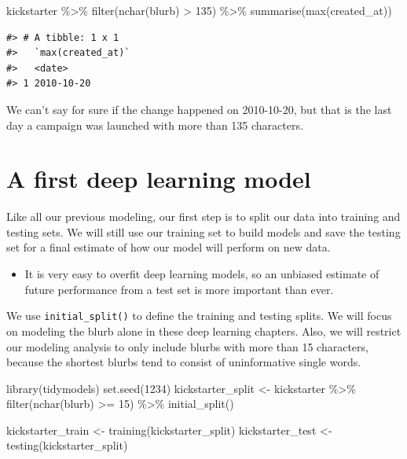 \documentclass[
]{krantz}
\makeatletter
\newenvironment{Shaded}{\begin{snugshade}}{\end{snugshade}}
\newcommand{\DecValTok}[1]{\textcolor[rgb]{0.00,0.00,0.81}{#1}}
\newcommand{\FunctionTok}[1]{\textcolor[rgb]{0.00,0.00,0.00}{#1}}
\newcommand{\NormalTok}[1]{#1}
\newcommand{\OtherTok}[1]{\textcolor[rgb]{0.56,0.35,0.01}{#1}}
\newcommand{\SpecialCharTok}[1]{\textcolor[rgb]{0.00,0.00,0.00}{#1}}
\newenvironment{kframe}{%
\medskip{}
\setlength{\fboxsep}{.8em}
 \def\at@end@of@kframe{}%
 \ifinner\ifhmode%
  \def\at@end@of@kframe{\end{minipage}}%
  \begin{minipage}{\columnwidth}%
 \fi\fi%
 \def\FrameCommand##1{\hskip\@totalleftmargin \hskip-\fboxsep
 \colorbox{shadecolor}{##1}\hskip-\fboxsep
     \hskip-\linewidth \hskip-\@totalleftmargin \hskip\columnwidth}%
 \MakeFramed {\advance\hsize-\width
   \@totalleftmargin\z@ \linewidth\hsize
   \@setminipage}}%
 {\par\unskip\endMakeFramed%
 \at@end@of@kframe}
\renewenvironment{Shaded}{\begin{kframe}}{\end{kframe}}
\newenvironment{rmdblock}[1]
  {\begin{shaded*}
  \begin{itemize}[left = -1cm, labelsep = 1cm]
  \renewcommand{\labelitemi}{
    \raisebox{-.7\height}[0pt][0pt]{
      {\setkeys{Gin}{width=3em,keepaspectratio}\texttt{[image: images/\#1]}}
    }
  }
 
  \item
  }
  {
  \end{itemize}
  \end{shaded*}
  }
\newenvironment{rmdwarning}
  {\begin{rmdblock}{warning}}
  {\end{rmdblock}}
\makeatother
\begin{document}
\begin{Shaded}
\begin{Highlighting}[]
\NormalTok{kickstarter }\SpecialCharTok{\%\textgreater{}\%}
  \FunctionTok{filter}\NormalTok{(}\FunctionTok{nchar}\NormalTok{(blurb) }\SpecialCharTok{\textgreater{}} \DecValTok{135}\NormalTok{) }\SpecialCharTok{\%\textgreater{}\%}
  \FunctionTok{summarise}\NormalTok{(}\FunctionTok{max}\NormalTok{(created\_at))}
\end{Highlighting}
\end{Shaded}

\begin{verbatim}
#> # A tibble: 1 x 1
#>   `max(created_at)`
#>   <date>           
#> 1 2010-10-20
\end{verbatim}

We can't say for sure if the change happened on 2010-10-20, but that is the last day a campaign was launched with more than 135 characters.

\hypertarget{firstdlclassification}{%
\section{A first deep learning model}\label{firstdlclassification}}

Like all our previous modeling, our first step is to split our data into training and testing sets. We will still use our training set to build models and save the testing set for a final estimate of how our model will perform on new data.


\begin{rmdwarning}
It is very easy to overfit deep learning models, so an unbiased estimate
of future performance from a test set is more important than ever.
\end{rmdwarning}

We use \texttt{initial\_split()} to define the training and testing splits. We will focus on modeling the blurb alone in these deep learning chapters. Also, we will restrict our modeling analysis to only include blurbs with more than 15 characters, because the shortest blurbs tend to consist of uninformative single words.

\begin{Shaded}
\begin{Highlighting}[]
\FunctionTok{library}\NormalTok{(tidymodels)}
\FunctionTok{set.seed}\NormalTok{(}\DecValTok{1234}\NormalTok{)}
\NormalTok{kickstarter\_split }\OtherTok{\textless{}{-}}\NormalTok{ kickstarter }\SpecialCharTok{\%\textgreater{}\%}
  \FunctionTok{filter}\NormalTok{(}\FunctionTok{nchar}\NormalTok{(blurb) }\SpecialCharTok{\textgreater{}=} \DecValTok{15}\NormalTok{) }\SpecialCharTok{\%\textgreater{}\%}
  \FunctionTok{initial\_split}\NormalTok{()}

\NormalTok{kickstarter\_train }\OtherTok{\textless{}{-}} \FunctionTok{training}\NormalTok{(kickstarter\_split)}
\NormalTok{kickstarter\_test }\OtherTok{\textless{}{-}} \FunctionTok{testing}\NormalTok{(kickstarter\_split)}
\end{Highlighting}
\end{Shaded}
\end{document}
